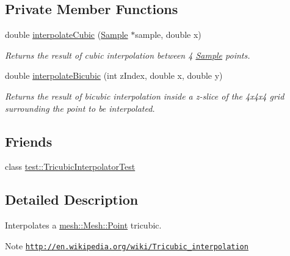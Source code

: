 \subsection*{Private Member Functions}
\begin{DoxyCompactItemize}
\item 
double \hyperlink{classassignment_1_1_tricubic_interpolator_afcf8e9955ee7e7852e60ebd4e1187750}{interpolateCubic} (\hyperlink{structassignment_1_1_tricubic_interpolator_1_1_sample}{Sample} $\ast$sample, double x)
\begin{DoxyCompactList}\small\item\em Returns the result of cubic interpolation between 4 \hyperlink{structassignment_1_1_tricubic_interpolator_1_1_sample}{Sample} points. \item\end{DoxyCompactList}\item 
double \hyperlink{classassignment_1_1_tricubic_interpolator_a58acbe3aef7780ce192dca441a39be1c}{interpolateBicubic} (int zIndex, double x, double y)
\begin{DoxyCompactList}\small\item\em Returns the result of bicubic interpolation inside a z-\/slice of the 4x4x4 grid surrounding the point to be interpolated. \item\end{DoxyCompactList}\end{DoxyCompactItemize}
\subsection*{Friends}
\begin{DoxyCompactItemize}
\item 
\hypertarget{classassignment_1_1_tricubic_interpolator_a507b8c8173a81dd673312db5aa36c817}{
class \hyperlink{classassignment_1_1_tricubic_interpolator_a507b8c8173a81dd673312db5aa36c817}{test::TricubicInterpolatorTest}}
\label{classassignment_1_1_tricubic_interpolator_a507b8c8173a81dd673312db5aa36c817}

\end{DoxyCompactItemize}


\subsection{Detailed Description}
Interpolates a \hyperlink{structmesh_1_1_mesh_1_1_point}{mesh::Mesh::Point} tricubic. \begin{DoxyNote}{Note}
\href{http://en.wikipedia.org/wiki/Tricubic_interpolation}{\tt http://en.wikipedia.org/wiki/Tricubic\_\-interpolation} 
\end{DoxyNote}


